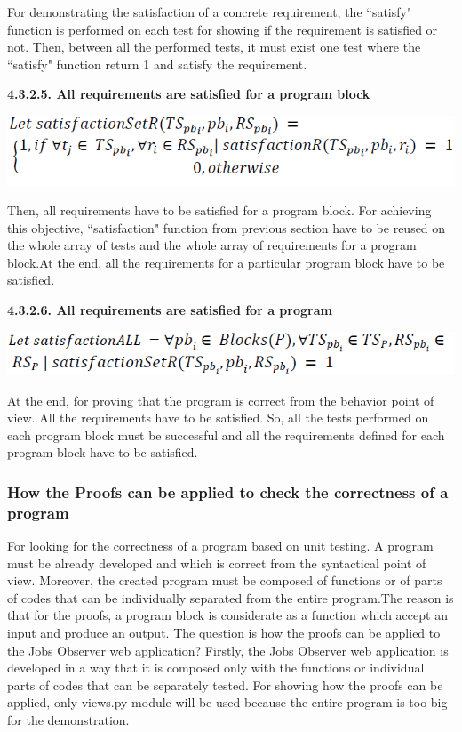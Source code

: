 \documentclass[conference,compsoc]{IEEEtran}
\begin{document}
For demonstrating the satisfaction of a concrete requirement, the ``satisfy" function is performed on each test for showing if the requirement is satisfied or not. Then, between all the performed tests, it must exist one test where the ``satisfy" function return 1 and satisfy the requirement. 

\noindent
\newline
\textbf{4.3.2.5. All requirements are satisfied for a program block}
\begin{center}
\includegraphics[scale=0.5]{Proof2-Part5.png} 
\end{center}

Then, all requirements have to be satisfied for a program block. For achieving this objective, ``satisfaction" function from previous section have to be reused on the whole array of tests and the whole array of requirements for a program block.At the end, all the requirements for a particular program block have to be satisfied. 

\noindent
\newline
\textbf{4.3.2.6. All requirements are satisfied for a program}
\begin{center}
\includegraphics[scale=0.5]{Proof2-Part6.png} 
\end{center}

At the end, for proving that the program is correct from the behavior point of view. All the requirements have to be satisfied. So, all the tests performed on each program block must be successful and all the requirements defined for each program block have to be satisfied. 

\subsubsection{How the Proofs can be applied to check the correctness of a program}
For looking for the correctness of a program based on unit testing. A program must be already developed and which is correct from the syntactical point of view. Moreover, the created program must be composed of functions or of parts of codes that can be individually separated from the entire program.The reason is that for the proofs, a program block is considerate as a function which accept an input and produce an output.
\newline 
The question is how the proofs can be applied to the Jobs Observer web application?
\newline                                                         
Firstly, the Jobs Observer web application is developed in a way that it is composed only with the functions or individual parts of codes that can be separately tested. For showing how the proofs can be applied, only views.py module will be used because the entire program is too big for the demonstration. 
\end{document}
